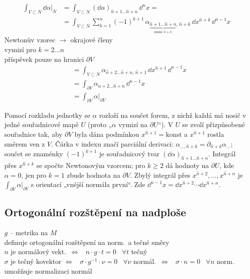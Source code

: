 \begin{align*}
  \int_{V\subset N}\dd\alpha|_N
  &= \int_{V\subset N}(\dd\alpha)_{\hat n+1\ldots\hat n+n}\,\dd^n x = \\
  &= \int_{V\subset N}\sum_{k=1}^{n}(-1)^{k+1}\,
     \alpha_{\underbrace{\scriptstyle\hat n+1\ldots\hat n+n}_{\text{mimo }\hat n+k},\,\hat n+k}\,
     \dd x^{\hat n+k}\,\dd^{n-1}x
\end{align*}
\quad Newtonův vzorec $\to$ okrajové členy \\
\quad vymizí pro $k = 2\ldots n$ \\
\quad příspěvek pouze na hranici $\partial V$
\begin{align*}
  &= \int_{V\subset N}\alpha_{\hat n+2\ldots\hat n+n,\,\hat n+1}\,\dd x^{\hat n+1}\,\dd^{n-1}x \\
  &= \int_{\partial V}\alpha_{\hat n+2\ldots\hat n+n}\,\dd^{n-1}x \\
  &= \int_{\partial V}\alpha|_{\partial V}
\end{align*}

\begin{vysvetleni}
Pomocí rozkladu jednotky se $\alpha$ rozloží na součet forem, z nichž každá má nosič v jedné souřadnicové mapě $U$ (proto „$\alpha$ vymizí na $\partial U$“). V $U$ se zvolí přizpůsobené souřadnice tak, aby $\partial V$ byla dána podmínkou $x^{\hat n+1}=\text{konst}$ a $x^{\hat n+1}$ rostla směrem ven z $V$. Čárka v indexu značí parciální derivaci: $\alpha_{\ldots,\hat n+k}=\partial_{\hat n+k}\alpha_{\ldots}$; součet se znaménky $(-1)^{k+1}$ je souřadnicový tvar $(\dd\alpha)_{\hat n+1\ldots\hat n+n}$. Integrál přes $x^{\hat n+k}$ se spočte Newtonovým vzorcem; pro $k\ge2$ dá hodnoty na $\partial U$, kde $\alpha=0$, jen pro $k=1$ zbude hodnota na $\partial V$. Zbylý integrál přes $x^{\hat n+2},\ldots,x^{\hat n+n}$ je $\int_{\partial V}\alpha|_{\partial V}$ s orientací „vnější normála první“. Zde $\dd^{n-1}x=\dd x^{\hat n+2}\cdots\dd x^{\hat n+n}$.
\end{vysvetleni}

\subsection{Ortogonální rozštěpení na nadploše}

$g$ -- metrika na $M$ \\
\quad definuje ortogonální rozštěpení na norm.\ a tečné směry \\
\quad\quad $n$ je normálový vekt.\ $\Leftrightarrow$ \ $n\cdot g\cdot t = 0$ \ $\forall t$ tečný \\
\quad\quad $\sigma$ je tečný kovektor $\Leftrightarrow$ \ $\sigma\cdot g^{-1}\cdot\nu = 0$ \ $\forall\nu$ normál.\
$\Leftrightarrow$ \ $\sigma\cdot n = 0$ \ $\forall n$ norm. \\
\quad umožňuje normalizaci normál

